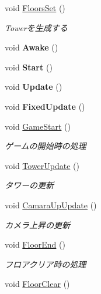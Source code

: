 \begin{DoxyCompactItemize}
\item 
void \hyperlink{class_a_l_l_tower_a110e253951597032d6dbd249b5bb16ac}{Floors\+Set} ()
\begin{DoxyCompactList}\small\item\em Towerを生成する \end{DoxyCompactList}\item 
\mbox{\label{class_a_l_l_tower_af1eed1caa5113b288153ae9556c14363}} 
void {\bfseries Awake} ()
\item 
\mbox{\label{class_a_l_l_tower_ac0089036e2b52b613d13a1ab97d18eb1}} 
void {\bfseries Start} ()
\item 
\mbox{\label{class_a_l_l_tower_a16bc010a4fceae1987cb6b8744821239}} 
void {\bfseries Update} ()
\item 
\mbox{\label{class_a_l_l_tower_ac46483caa2fb9d145bcc80032ee052f2}} 
void {\bfseries Fixed\+Update} ()
\item 
void \hyperlink{class_a_l_l_tower_a1188a8535e12016d11fb5d10674ab02a}{Game\+Start} ()
\begin{DoxyCompactList}\small\item\em ゲームの開始時の処理 \end{DoxyCompactList}\item 
void \hyperlink{class_a_l_l_tower_aed8435a5e40b07b3b6a88d0ad08e7904}{Tower\+Update} ()
\begin{DoxyCompactList}\small\item\em タワーの更新 \end{DoxyCompactList}\item 
void \hyperlink{class_a_l_l_tower_aef377489de75ef1b4954862980c8fba5}{Camara\+Up\+Update} ()
\begin{DoxyCompactList}\small\item\em カメラ上昇の更新 \end{DoxyCompactList}\item 
void \hyperlink{class_a_l_l_tower_a5cd837400467a269c9617aaecb9b4815}{Floor\+End} ()
\begin{DoxyCompactList}\small\item\em フロアクリア時の処理 \end{DoxyCompactList}\item 
void \hyperlink{class_a_l_l_tower_a0e19c6ee9a0741934d50233f2adb725d}{Floor\+Clear} ()

\end{DoxyCompactItemize}
